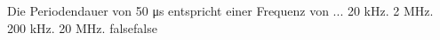     {Die Periodendauer von 50 \si{\micro\second} entspricht einer Frequenz von ...}
    {20 kHz.}
    {2 MHz.}
    {200 kHz.}
    {20 MHz.}
    {false}{false}